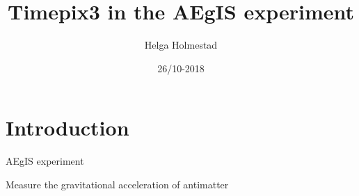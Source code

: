 \documentclass{beamer}
\title[]{Timepix3 in the AEgIS experiment}
\author{Helga Holmestad}
\institute{University of Oslo}
\date{26/10-2018}
\begin{document}
\begin{frame}
  \titlepage
\end{frame}


\section{Introduction}

\begin{frame}{\centering AEgIS experiment}
  \vspace{0.5cm}
  \begin{center}
  Measure the gravitational acceleration of antimatter
      

\end{center}
\end{frame}
\end{document}

